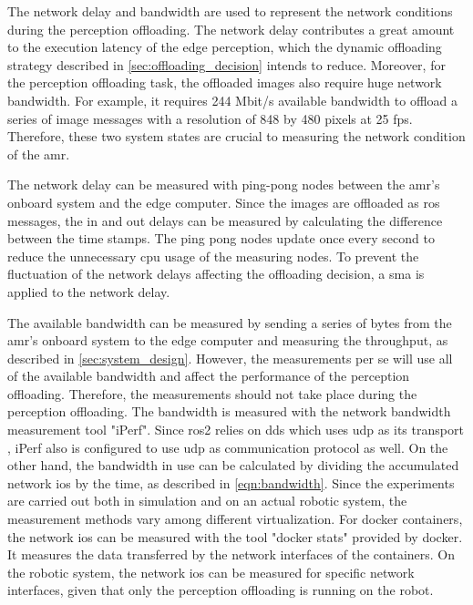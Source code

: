 The network delay and bandwidth are used to represent the network conditions during the perception offloading. The network delay contributes a great amount to the execution latency of the edge perception, which the dynamic offloading strategy described in \cref{sec:offloading_decision} intends to reduce. Moreover, for the perception offloading task, the offloaded images also require huge network bandwidth. For example, it requires 244 Mbit/s available bandwidth to offload a series of image messages with a resolution of 848 by 480 pixels at 25 \gls{fps}. Therefore, these two system states are crucial to measuring the network condition of the \gls{amr}.

The network delay can be measured with ping-pong nodes between the \gls{amr}'s onboard system and the edge computer. Since the images are offloaded as \gls{ros} messages, the in and out delays can be measured by calculating the difference between the time stamps. The ping pong nodes update once every second to reduce the unnecessary \gls{cpu} usage of the measuring nodes. To prevent the fluctuation of the network delays affecting the offloading decision, a \gls{sma} is applied to the network delay. 

The available bandwidth can be measured by sending a series of bytes from the \gls{amr}'s onboard system to the edge computer and measuring the throughput, as described in \cref{sec:system_design}. However, the measurements per se will use all of the available bandwidth and affect the performance of the perception offloading. Therefore, the measurements should not take place during the perception offloading. The bandwidth is measured with the network bandwidth measurement tool "iPerf". Since \gls{ros}2 relies on \gls{dds} which uses \gls{udp} as its transport \cite{Macenski2022}, iPerf also is configured to use \gls{udp} as communication protocol as well. On the other hand, the bandwidth in use can be calculated by dividing the accumulated network \glspl{io} by the time, as described in \cref{eqn:bandwidth}. Since the experiments are carried out both in simulation and on an actual robotic system, the measurement methods vary among different virtualization. For \gls{docker} containers, the network \glspl{io} can be measured with the tool "docker stats" provided by \gls{docker}. It measures the data transferred by the network interfaces of the containers. On the robotic system, the network \glspl{io} can be measured for specific network interfaces, given that only the perception offloading is running on the robot.


